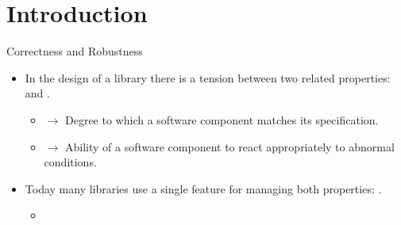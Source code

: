 \section{Introduction}

\begin{frame}[t]{Correctness and Robustness}
\begin{itemize}
  \item In the design of a library there is a tension between two related
properties:  and .

  \vfill
  \begin{itemize}

    \pause
    \item {} $\rightarrow$ Degree to which a software
component matches its specification.

    \pause
    \item {} $\rightarrow$ Ability of a software component to
react appropriately to abnormal conditions.

  \end{itemize}

  \vfill
  \pause
  \item Today many libraries use a single feature for managing both properties:
        .
    \begin{itemize}
      \item {}
    \end{itemize}

\end{itemize}
\end{frame}

